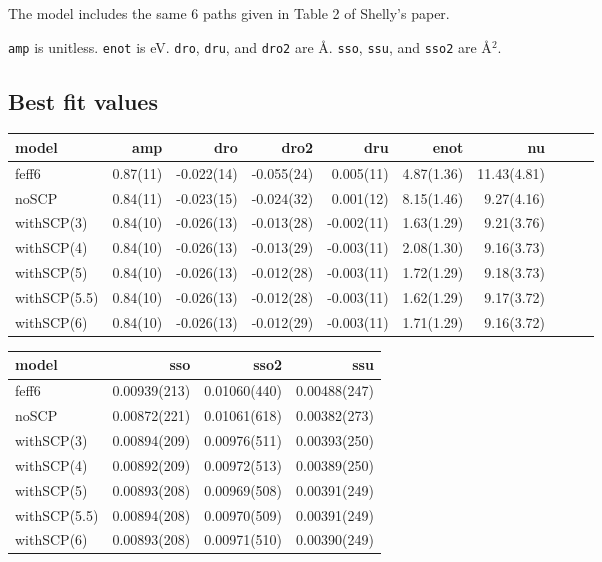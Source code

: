 \documentclass[11pt]{article}
\begin{document}
The model includes the same 6 paths given in Table 2 of Shelly's
paper.

\texttt{amp} is unitless. \texttt{enot} is eV. \texttt{dro},
\texttt{dru}, and \texttt{dro2} are {\AA}. \texttt{sso}, \texttt{ssu},
and \texttt{sso2} are \AA$^2$.

\subsection{Best fit values}
\label{sec:orgheadline20}

\begin{center}
  \footnotesize
  \begin{tabular}{lrrrrrrrrr}
    model & amp & dro & dro2 & dru & enot & nu \\
    \hline
    feff6        & 0.87(11) & -0.022(14) & -0.055(24) &  0.005(11) & 4.87(1.36) & 11.43(4.81) \\
    noSCP        & 0.84(11) & -0.023(15) & -0.024(32) &  0.001(12) & 8.15(1.46) &  9.27(4.16) \\
    withSCP(3)   & 0.84(10) & -0.026(13) & -0.013(28) & -0.002(11) & 1.63(1.29) &  9.21(3.76) \\
    withSCP(4)   & 0.84(10) & -0.026(13) & -0.013(29) & -0.003(11) & 2.08(1.30) &  9.16(3.73) \\
    withSCP(5)   & 0.84(10) & -0.026(13) & -0.012(28) & -0.003(11) & 1.72(1.29) &  9.18(3.73) \\
    withSCP(5.5) & 0.84(10) & -0.026(13) & -0.012(28) & -0.003(11) & 1.62(1.29) &  9.17(3.72) \\
    withSCP(6)   & 0.84(10) & -0.026(13) & -0.012(29) & -0.003(11) & 1.71(1.29) &  9.16(3.72) \\
  \end{tabular}

  \begin{tabular}{lrrr}
    model & sso & sso2 & ssu\\
    \hline
    feff6        & 0.00939(213) & 0.01060(440) & 0.00488(247)\\
    noSCP        & 0.00872(221) & 0.01061(618) & 0.00382(273)\\
    withSCP(3)   & 0.00894(209) & 0.00976(511) & 0.00393(250)\\
    withSCP(4)   & 0.00892(209) & 0.00972(513) & 0.00389(250)\\
    withSCP(5)   & 0.00893(208) & 0.00969(508) & 0.00391(249)\\
    withSCP(5.5) & 0.00894(208) & 0.00970(509) & 0.00391(249)\\
    withSCP(6)   & 0.00893(208) & 0.00971(510) & 0.00390(249)\\
  \end{tabular}
\end{center}
\end{document}
